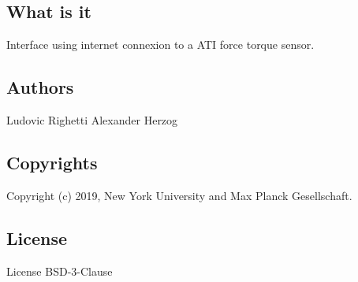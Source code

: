 \subsection*{What is it}

Interface using internet connexion to a A\+TI force torque sensor.

\subsection*{Authors}

Ludovic Righetti Alexander Herzog

\subsection*{Copyrights}

Copyright (c) 2019, New York University and Max Planck Gesellschaft.

\subsection*{License}

License B\+S\+D-\/3-\/\+Clause 